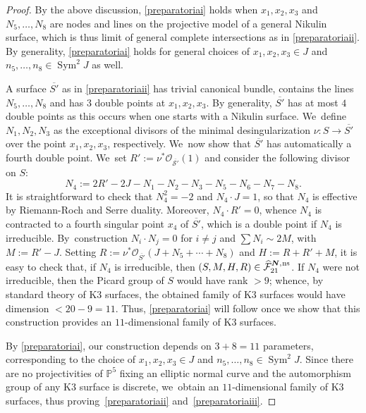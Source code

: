 \documentclass[11pt]{article}
\newcommand{\ns}{{\mkern1mu\mathrm{ns}}}
\newcommand{\bN}{\boldsymbol{N}}
\theoremstyle{plain}
\theoremstyle{definition}
\DeclareMathOperator{\Sym}{Sym}
\newcommand\PP{{\mathbb P}}
\newcommand\F{{\mathcal F}}
\begin{document}
\begin{proof}
By the above discussion, \eqref{preparatoriai} holds when $x_1,x_2,x_3$ and $N_5,\ldots,N_8$ are nodes and lines on the projective model of a general Nikulin surface, which is thus limit of general complete intersections as in \eqref{preparatoriaii}. By generality, \eqref{preparatoriai} holds for general choices of $x_1,x_2,x_3\in J$ and $n_5,\ldots,n_8\in \Sym^2J$ as well.

A surface $\overline{S'}$ as in \eqref{preparatoriaii} has trivial canonical bundle, contains the lines $N_5,\ldots, N_8$ and has $3$ double points at $x_1,x_2,x_3$. By generality, $\overline{S'}$ has at most $4$ double points as this occurs when one starts with a Nikulin surface. We~define $N_1,N_2,N_3$ as the exceptional divisors of the minimal desingularization $\nu:S\to \overline{S'}$ over the point $x_1,x_2,x_3$, respectively. We~now show that $\overline{S'}$ has automatically a fourth double point. We~set $R':=\nu^*\mathcal{O_{\overline{S'}}}(1)$ and consider the following divisor on $S$:
\[
N_4:=2R'-2J-N_1-N_2-N_3-N_5-N_6-N_7-N_8.
\]
It is straightforward to check that $N_4^2=-2$ and $N_4 \cdot J=1$, so that $N_4$ is effective by Riemann-Roch and Serre duality. Moreover,
$N_4\cdot R'=0$, whence $N_4$ is contracted to a fourth singular point $x_4$ of $\overline{S'}$, which is a double point if $N_4$ is irreducible. By~construction $N_i\cdot N_j=0$ for $i\neq j$ and $\sum N_i \sim 2M$, with $M:=R'-J$. Setting $R:=\nu^*\mathcal{O}_{\overline{S'}}(J+N_5+\cdots+N_8)$ and $H:=R+R'+M$, it is easy to check that, if $N_4$ is irreducible, then $(S,M,H,R)\in \widehat{\F}_{21}^{\bN,\ns}$. If $N_4$ were not irreducible, then the Picard group of $S$ would have rank $>9$; whence, by standard theory of K3 surfaces, the obtained family of K3 surfaces would have dimension $<20-9=11$. Thus, \eqref{preparatoriai} will follow once we show that this construction provides an $11$-dimensional family of K3 surfaces.

By \eqref{preparatoriai}, our construction depends on $3+8=11$ parameters, corresponding to the choice of $x_1,x_2,x_3\in J$ and $n_5,\ldots,n_8\in\Sym^2J$. Since there are no projectivities of $\PP^5$ fixing an elliptic normal curve and the automorphism group of any K3 surface is discrete, we~obtain an $11$-dimensional family of K3 surfaces, thus proving~\eqref{preparatoriaii} and~\eqref{preparatoriaiii}.
\end{proof}
\end{document}
